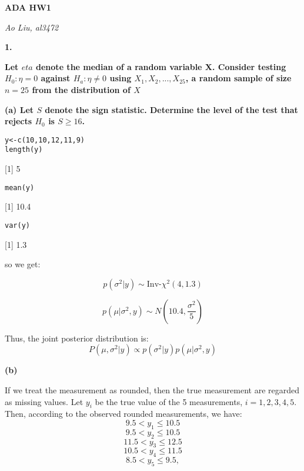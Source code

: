 \documentclass[letterpaper,11pt]{article}
\begin{document}
\begin{center}
	\textbf{\LARGE{ADA HW1}}
\end{center}

\begin{center}
	\textsl{Ao Liu, al3472}
\end{center}


\bigbreak
\bigbreak
\bigbreak

\begin{addmargin}[-2em]{0em} \large{\textbf{1. }}\large{\textsl{}} \end{addmargin}



  \begin{addmargin}[-1.1em]{0em} \textbf{Let $eta$ denote the median of a random variable X. Consider testing $H_0: \eta = 0$ against $H_a: \eta \neq 0$ using $X_1,X_2,...,X_{25}$, a random sample of size $n = 25$ from the distribution of $X$}\par \end{addmargin}


\begin{addmargin}[-1.1em]{0em} \textbf{(a)  Let $S$ denote the sign statistic. Determine the level of the test that rejects $H_0$ is $S\geq16$.}\par \end{addmargin}


\begin{lstlisting}
y<-c(10,10,12,11,9)
length(y)
\end{lstlisting}
[1] 5
\begin{lstlisting}
mean(y)
\end{lstlisting}
[1] 10.4
\begin{lstlisting}
var(y)
\end{lstlisting}
[1] 1.3

so we get:

$$p(\sigma^2\vert y) \sim \text{Inv-} \chi^2(4,1.3)$$

$$p(\mu\vert\sigma^2,y)\sim N(10.4,\frac{\sigma^2}{5})$$


Thus, the joint posterior distribution is:
$$P(\mu,\sigma^2\vert y)\propto p(\sigma^2\vert y) p(\mu\vert\sigma^2,y)$$
\begin{addmargin}[-1.1em]{0em} \textbf{(b)}\par \end{addmargin}
If we treat the measurement as rounded, then the true
measurement are regarded as missing values. Let $y_i$ be the
true value of the 5 measurements, $i=1,2,3,4,5$. Then, according to the observed rounded measurements, we have:
$$9.5<y_1\leq 10.5$$
$$9.5<y_2\leq 10.5$$
$$11.5<y_3\leq 12.5$$
$$10.5<y_4\leq 11.5$$
$$8.5<y_5\leq 9.5,$$
\end{document}
